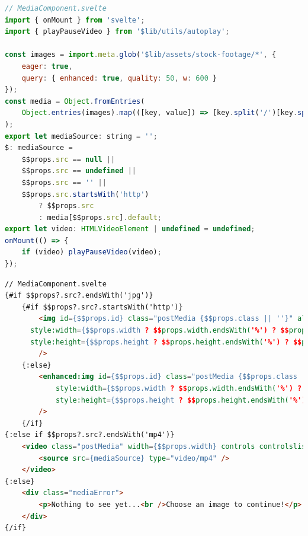 \documentclass[a4paper, 10pt]{article}
\begin{document}
\begin{lstlisting}[caption=MediaComponent in Svelte (Script), label={lst:Svelte:MediaComponent:Script}, language=JavaScript]
// MediaComponent.svelte
import { onMount } from 'svelte';
import { playPauseVideo } from '$lib/utils/autoplay';

const images = import.meta.glob('$lib/assets/stock-footage/*', {
	eager: true,
	query: { enhanced: true, quality: 50, w: 600 }
});
const media = Object.fromEntries(
	Object.entries(images).map(([key, value]) => [key.split('/')[key.split('/').length - 1], value])
);
export let mediaSource: string = '';
$: mediaSource =
	$$props.src == null ||
	$$props.src == undefined ||
	$$props.src == '' ||
	$$props.src.startsWith('http')
		? $$props.src
		: media[$$props.src].default;
export let video: HTMLVideoElement | undefined = undefined;
onMount(() => {
	if (video) playPauseVideo(video);
});
\end{lstlisting}

\begin{lstlisting}[caption=MediaComponent in Svelte (Template), label={lst:Svelte:MediaComponent:Template}, language=HTML, firstnumber=24]
// MediaComponent.svelte
{#if $$props?.src?.endsWith('jpg')}
	{#if $$props?.src?.startsWith('http')}
		<img id={$$props.id} class="postMedia {$$props.class || ''}" alt={$$props.alt} src={mediaSource} loading={$$props.eagerLoading ? 'eager' : 'lazy'}
      style:width={$$props.width ? $$props.width.endsWith('%') ? $$props.width : $$props.width + 'px' : undefined}
      style:height={$$props.height ? $$props.height.endsWith('%') ? $$props.height : $$props.height + 'px' : $$props.width ? $$props.width + 'px' : undefined}
		/>
	{:else}
		<enhanced:img id={$$props.id} class="postMedia {$$props.class || ''}" alt={$$props.alt} src={mediaSource} loading={$$props.eagerLoading ? 'eager' : 'lazy'}
			style:width={$$props.width ? $$props.width.endsWith('%') ? $$props.width : $$props.width + 'px' : undefined}
			style:height={$$props.height ? $$props.height.endsWith('%') ? $$props.height : $$props.height + 'px' : $$props.width ? $$props.width + 'px' : undefined}
		/>
	{/if}
{:else if $$props?.src?.endsWith('mp4')}
	<video class="postMedia" width={$$props.width} controls controlslist="nodownload,nofullscreen,noremoteplayback" disablepictureinpicture loop muted preload={$$props.eagerLoading ? 'auto' : 'metadata'} bind:this={video}>
		<source src={mediaSource} type="video/mp4" />
	</video>
{:else}
	<div class="mediaError">
		<p>Nothing to see yet...<br />Choose an image to continue!</p>
	</div>
{/if}
\end{lstlisting}
\end{document}
